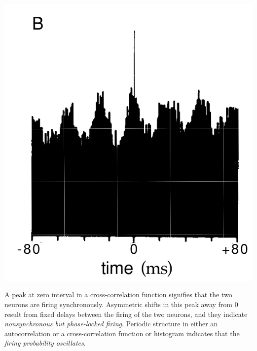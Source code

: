 \begin{exm}
\begin{center}
    \includegraphics[scale = 0.2]{png/Figure1-12-B.png}\\
  \end{center}
\end{exm}
\begin{rem}
  A peak at zero interval in a cross-correlation function signifies that the two neurons are firing synchronously. Asymmetric shifts in this peak away from 0 result from fixed delays between the firing of the two neurons, and they indicate \emph{nonsynchronous but phase-locked firing}. Periodic structure in either an autocorrelation or a cross-correlation function or histogram indicates that the \emph{firing probability oscillates}.
\end{rem}

